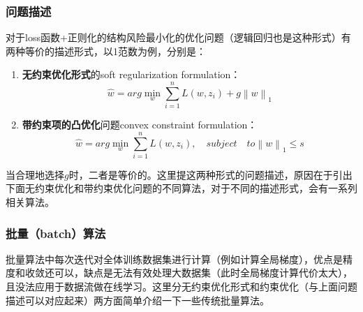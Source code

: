 \documentclass[10pt,a4paper]{ctexbook}
\begin{document}
\subsubsection{问题描述}
对于loss函数+正则化的结构风险最小化的优化问题（逻辑回归也是这种形式）有两种等价的描述形式，以1范数为例，分别是：
\begin{enumerate}
\item \textbf{无约束优化形式}的soft regularization formulation：
\[
\hat{w}=arg\min\limits_{w}{\sum\limits_{i=1}^{n}{L(w,z_{i})+g\left\|w\right\|_{1}}}
\]

\item \textbf{带约束项的凸优化}问题convex constraint formulation：
\[
\hat{w}=arg\min\limits_{w}{\sum\limits_{i=1}^{n}{L(w,z_{i})}}, \quad subject \quad to \left\|w\right\|_{1} \le s
\]

\end{enumerate}
当合理地选择$g$时，二者是等价的。这里提这两种形式的问题描述，原因在于引出下面无约束优化和带约束优化问题的不同算法，对于不同的描述形式，会有一系列相关算法。

\subsubsection{批量（batch）算法}
批量算法中每次迭代对全体训练数据集进行计算（例如计算全局梯度），优点是精度和收敛还可以，缺点是无法有效处理大数据集（此时全局梯度计算代价太大），且没法应用于数据流做在线学习。这里分无约束优化形式和约束优化（与上面问题描述可以对应起来）两方面简单介绍一下一些传统批量算法。
\end{document}
